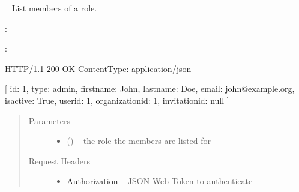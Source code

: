 \documentclass[letterpaper,10pt,english]{sphinxmanual}
\begin{document}
\begin{fulllineitems}
\label{\detokenize{resources/role:get--roles-(role_id)-members}}~
List members of a role.

:

\begin{sphinxVerbatim}[commandchars=\\\{\}]
  
 
 
\end{sphinxVerbatim}

:

\begin{sphinxVerbatim}[commandchars=\\\{\}]
HTTP/1.1 200 OK
Content\PYGZhy{}Type: application/json

[
    \PYGZob{}
        \PYGZsq{}id\PYGZsq{}: 1,
        \PYGZsq{}type\PYGZsq{}: \PYGZsq{}admin\PYGZsq{},
        \PYGZsq{}firstname\PYGZsq{}: \PYGZsq{}John\PYGZsq{},
        \PYGZsq{}lastname\PYGZsq{}: \PYGZsq{}Doe\PYGZsq{},
        \PYGZsq{}email\PYGZsq{}: \PYGZsq{}john@example.org\PYGZsq{},
        \PYGZsq{}is\PYGZus{}active\PYGZsq{}: True,
        \PYGZsq{}user\PYGZus{}id\PYGZsq{}: 1,
        \PYGZsq{}organization\PYGZus{}id\PYGZsq{}: 1,
        \PYGZsq{}invitation\PYGZus{}id\PYGZsq{}: null
    \PYGZcb{}
]
\end{sphinxVerbatim}
\begin{quote}\begin{description}
\item[{Parameters}] \leavevmode\begin{itemize}
\item {} 
 () -- the role the members are listed for

\end{itemize}

\item[{Request Headers}] \leavevmode\begin{itemize}
\item {} 
\href{http://tools.ietf.org/html/rfc7235\#section-4.2}{Authorization} -- JSON Web Token to authenticate

\end{itemize}


\end{description}
\end{quote}
\end{fulllineitems}
\end{document}
